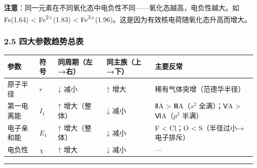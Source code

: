 \documentclass[a4paper,11pt]{ctexart}
\newcounter{none}
\begin{document}
\textbf{注意}：同一元素在不同氧化态中电负性不同------氧化态越高，电负性越大。如 Fe(1.64) \textless{} Fe\textsuperscript{2+}(1.83) \textless{} Fe\textsuperscript{3+}(1.96)。这是因为有效核电荷随氧化态升高而增大。

\subsubsection{2.5 四大参数趋势总表}\label{ux56dbux5927ux53c2ux6570ux8d8bux52bfux603bux8868}

{\def\LTcaptype{none} %
\begin{longtable}[]{@{}
  >{\raggedright\arraybackslash}p{}
  >{\centering\arraybackslash}p{}
  >{\centering\arraybackslash}p{}
  >{\centering\arraybackslash}p{}
  >{\raggedright\arraybackslash}p{}@{}}
\toprule\noalign{}
\begin{minipage}[b]{\linewidth}\raggedright
参数
\end{minipage} & \begin{minipage}[b]{\linewidth}\centering
符号
\end{minipage} & \begin{minipage}[b]{\linewidth}\centering
同周期（左→右）
\end{minipage} & \begin{minipage}[b]{\linewidth}\centering
同主族（上→下）
\end{minipage} & \begin{minipage}[b]{\linewidth}\raggedright
主要反常
\end{minipage} \\
\midrule\noalign{}
\endhead
\bottomrule\noalign{}
\endlastfoot
原子半径 & \(r\) & ↓ 减小 & ↑ 增大 & 稀有气体突增（范德华半径） \\
第一电离能 & \(I_1\) & ↑ 增大（整体） & ↓ 减小 & ⅡA \textgreater{} ⅢA（\(s^2\) 全满）；ⅤA \textgreater{} ⅥA（\(p^3\) 半满） \\
电子亲和能 & \(E_1\) & ↑ 增大（整体） & ↓ 减小 & F \textless{} Cl；O \textless{} S（半径过小→电子排斥） \\
电负性 & \(\chi\) & ↑ 增大 & ↓ 减小 & --- \\
\end{longtable}
}

\begin{center}\rule{0.5\linewidth}{0.5pt}\end{center}
\end{document}
